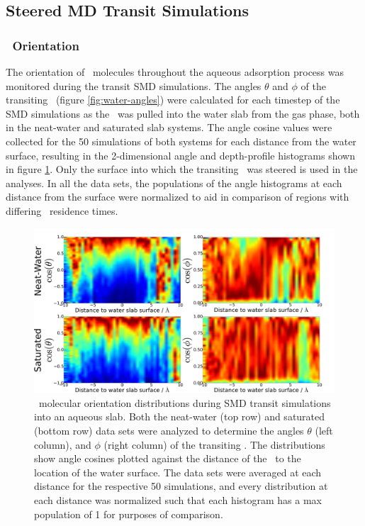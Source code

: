 \subsection{Steered MD Transit Simulations}

\subsubsection {\suldiox~Orientation}

	The orientation of \suldiox~molecules throughout the aqueous adsorption process was monitored during the transit SMD simulations. The angles $\theta$ and $\phi$ of the transiting \suldiox~(figure \ref{fig:water-angles}) were calculated for each timestep of the SMD simulations as the \suldiox~was pulled into the water slab from the gas phase, both in the neat-water and saturated slab systems. The angle cosine values were collected for the 50 simulations of both systems for each distance from the water surface, resulting in the 2-dimensional angle and depth-profile histograms shown in figure \ref{fig:so2-transit-angles}. Only the surface into which the transiting \suldiox~was steered is used in the analyses. In all the data sets, the populations of the angle histograms at each distance from the surface were normalized to aid in comparison of regions with differing \suldiox~residence times.

\begin{figure}[h!]
	\begin{center}
		\includegraphics[scale=1.0]{images/transit-so2-angles/so2-angles-transit.png}
		\caption{\suldiox~molecular orientation distributions during SMD transit simulations into an aqueous slab. Both the neat-water (top row) and saturated (bottom row) data sets were analyzed to determine the angles $\theta$ (left column), and $\phi$ (right column) of the transiting \suldiox. The distributions show angle cosines plotted against the distance of the \suldiox~to the location of the water surface. The data sets were averaged at each distance for the respective 50 simulations, and every distribution at each distance was normalized such that each histogram has a max population of 1 for purposes of comparison.}
		\label{fig:so2-transit-angles}
	\end{center}
\end{figure}

